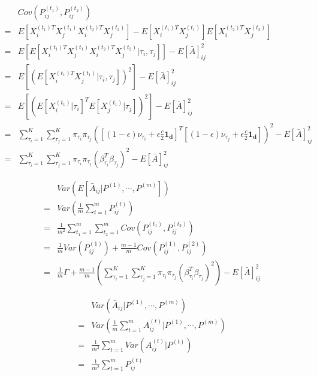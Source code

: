 \documentclass[a4paper]{article}
\begin{document}
\begin{align*}
	& Cov \left( P_{ij}^{(t_1)}, P_{ij}^{(t_2)} \right) \\
    = & E \left[ X_i^{(t_1)T} X_j^{(t_1)} X_i^{(t_2)T} X_j^{(t_2)} \right]
      - E \left[ X_i^{(t_1)T} X_j^{(t_1)} \right] E \left[ X_i^{(t_2)T} X_j^{(t_2)} \right]\\
    = & E \left[ E\left[ X_i^{(t_1)T} X_j^{(t_1)} X_i^{(t_2)T} X_j^{(t_2)} | \tau_i, \tau_j \right]\right] - E[\bar{A}]_{ij}^2\\
    = & E \left[ \left( E\left[ X_i^{(t_1)T} X_j^{(t_1)} | \tau_i, \tau_j \right] \right)^2 \right] - E[\bar{A}]_{ij}^2\\
    = & E \left[ \left( E\left[ X_i^{(t_1)} | \tau_i\right]^T E\left[ X_j^{(t_1)} | \tau_j \right] \right)^2 \right] - E[\bar{A}]_{ij}^2\\
    = & \sum_{\tau_i = 1}^K \sum_{\tau_j = 1}^K \pi_{\tau_i} \pi_{\tau_j}
    \left( \left[ (1-\epsilon) \nu_{\tau_i} + \epsilon \frac{c}{2} \boldsymbol{1_d} \right]^T \left[ (1-\epsilon) \nu_{\tau_j} + \epsilon \frac{c}{2} \boldsymbol{1_d} \right] \right)^2 - E[\bar{A}]_{ij}^2 \\
    = & \sum_{\tau_i = 1}^K \sum_{\tau_j = 1}^K \pi_{\tau_i} \pi_{\tau_j} \left( \beta_{\tau_i}^T \beta_{\tau_j} \right)^2 - E[\bar{A}]_{ij}^2
\end{align*}

\begin{align*}
    & Var \left( E \left[ \bar{A}_{ij} | P^{(1)}, \cdots, P^{(m)} \right] \right) \\
    = & Var \left( \frac{1}{m} \sum_{t=1}^m P_{ij}^{(t)} \right)\\
    = & \frac{1}{m^2} \sum_{t_1=1}^m \sum_{t_2=1}^m Cov \left( P_{ij}^{(t_1)}, P_{ij}^{(t_2)} \right) \\
    = & \frac{1}{m} Var \left( P_{ij}^{(1)} \right) + \frac{m-1}{m} Cov \left( P_{ij}^{(1)}, P_{ij}^{(2)} \right) \\
    = & \frac{1}{m} \Gamma + \frac{m-1}{m} \left( \sum_{\tau_i = 1}^K \sum_{\tau_j = 1}^K \pi_{\tau_i} \pi_{\tau_j} \left( \beta_{\tau_i}^T \beta_{\tau_j} \right)^2 \right) - E[\bar{A}]_{ij}^2
\end{align*}


\begin{align*}
    & Var \left( \bar{A}_{ij} | P^{(1)}, \cdots, P^{(m)} \right) \\
    = & Var \left( \frac{1}{m} \sum_{t=1}^m A_{ij}^{(t)} | P^{(1)}, \cdots, P^{(m)} \right) \\
    = & \frac{1}{m^2} \sum_{t=1}^m Var \left( A_{ij}^{(t)} | P^{(t)} \right) \\
    = & \frac{1}{m^2} \sum_{t=1}^m P_{ij}^{(t)}
\end{align*}
\end{document}
